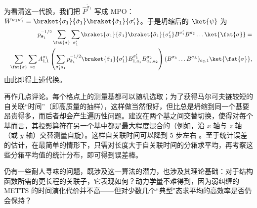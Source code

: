 为看清这一代换，我们把 $\hat{P}^{\tilde{\sigma}_1}$ 写成 MPO：$W^{\sigma_1 \sigma'_1} = \braket{\sigma_1}{\tilde{\sigma}_1} \braket{\tilde{\sigma}_1}{\sigma'_1}$。于是坍缩后的 $\ket{\psi}$ 为
\begin{eqnarray*}
& & p_{\tilde{\sigma}_1}^{-1/2} \sum_{\fat{\sigma}} \sum_{\sigma'_1} \braket{\sigma_1}{\tilde{\sigma}_1} \braket{\tilde{\sigma}_1}{\sigma'_1} B^{\sigma'_1} B^{\sigma_2} \ldots \ket{\fat{\sigma}} = \\
& & \sum_{\fat{\sigma}} \sum_{a_2} A^{\sigma_1}_{1,1} \left( \sum_{\sigma'_1 a_1}  p_{\tilde{\sigma}_1}^{-1/2}  \braket{\tilde{\sigma}_1}{\sigma'_1} B^{\sigma'_1}_{1,a_1} B^{\sigma_2}_{a_1,a_2} \right) (B^{\sigma_3} \ldots B^{\sigma_L})_{a_2,1} \ket{\fat{\sigma}} ,
\end{eqnarray*}
由此即得上述代换。

再作几点评论。每个格点上的测量基都可以随机选取；为了获得马尔可夫链较短的自关联``时间''（即高质量的抽样），这样做当然很好，但比总是坍缩到同一个基要昂贵得多，而后者却会产生遍历性问题。建议在两个基之间交替切换，使得对每个基而言，其投影算符在另一个基中都是最大程度混合的（例如，沿 $x$ 轴与 $z$ 轴（或 $y$ 轴）交替测量自旋）。这样自关联时间可以降到 5 步左右 \cite{Stoudenmire10}。至于统计误差的估计，在最简单的情形下，只需对长度大于自关联时间的分箱求平均，再考察这些分箱平均值的统计分布，即可得到误差棒。

仍有一些耐人寻味的问题，既涉及这一算法的潜力，也涉及其理论基础：对于结构函数所需的更长程的关联子，它表现如何？动力学量不难得到，因为弱纠缠的 METTS 的时间演化代价并不高——但对少数几个``典型"态求平均的高效率是否仍会保持？
